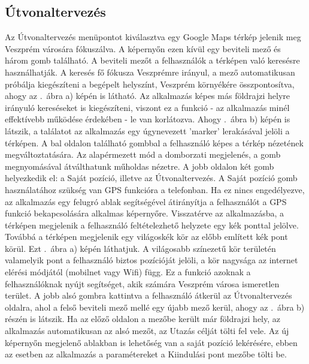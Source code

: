 \subsection {Útvonaltervezés}
\label {utvonalterv}
Az Útvonaltervezés menüpontot kiválasztva egy Google Maps térkép jelenik meg Veszprém városára fókuszálva.
A képernyőn ezen kívül egy beviteli mező és három gomb található.
A beviteli mezőt a felhasználók a térképen való keresésre használhatják.
A keresés fő fókusza Veszprémre irányul, a mező automatikusan próbálja kiegészíteni a begépelt helyszínt, Veszprém környékére összpontosítva, ahogy az .\ ábra a) képén is látható.
Az alkalmazás képes más földrajzi helyre irányuló kereséseket is kiegészíteni, viszont ez a funkció - az alkalmazás minél effektívebb működése érdekében - le van korlátozva.
Ahogy .\ ábra b) képén is látszik, a találatot az alkalmazás egy úgynevezett 'marker' lerakásával jelöli a térképen.
A bal oldalon található gombbal a felhasználó képes a térkép nézetének megváltoztatására.
Az alapérmezett mód a domborzati megjelenés, a gomb megnyomásával átválthatunk műholdas nézetre.
A jobb oldalon két gomb helyezkedik el: a Saját pozíció, illetve az Útvonaltervezés.
A Saját pozíció gomb használatához szükség van GPS funkcióra a telefonban.
Ha ez nincs engedélyezve, az alkalmazás egy felugró ablak segítségével átirányítja a felhasználót a GPS funkció bekapcsolására alkalmas képernyőre.
Visszatérve az alkalmazásba, a térképen megjelenik a felhasználó feltételezhető helyzete egy kék ponttal jelölve.
Továbbá a térképen megjelenik egy világoskék kör az előbb említett kék pont körül.
Ezt .\ ábra a) képén láthatjuk.
A világosabb színezetű kör területén valamelyik pont a felhasználó biztos pozícióját jelöli, a kör nagysága az internet elérési módjától (mobilnet vagy Wifi) függ.
Ez a funkció azoknak a felhasználóknak nyújt segítséget, akik számára Veszprém városa ismeretlen terület.
A jobb alsó gombra kattintva a felhasználó átkerül az Útvonaltervezés oldalra, ahol a felső beviteli mező mellé egy újabb mező kerül, ahogy az .\ ábra b) részén is látszik. 
Ha az előző oldalon a mezőbe került már földrajzi hely, az alkalmazás automatikusan az alsó mezőt, az Utazás célját tölti fel vele.
Az új képernyőn megjelenő ablakban is lehetőség van a saját pozíció lekérésére, ebben az esetben az alkalmazás a paramétereket a Kiindulási pont mezőbe tölti be.
